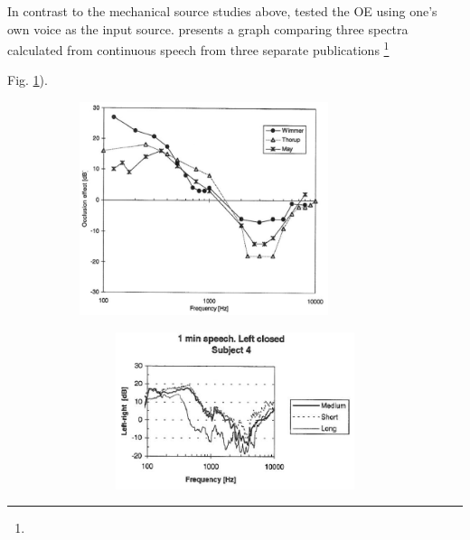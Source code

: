 In contrast to the mechanical source studies above, \cite{hansen:97b} tested the OE using one's own voice as the input source.  \cite{hansen:97b} presents a graph comparing three spectra calculated from continuous speech from three separate publications \DIFdelbegin \footnote{} %
\addtocounter{footnote}{-1}%
\DIFdel{(}\DIFdelend \DIFaddbegin {}\DIFaddend Fig. \ref{fig:hansenAverageOEa}).  
\DIFaddbegin \begin{figure}
\begin{subfigure}{0.45\textwidth}
  \centering
  \includegraphics[width=0.8\textwidth]{figure/hansenAverageOE.png}
  \caption{}
  \label{fig:hansenAverageOEa}
\end{subfigure}%
\hfill
\begin{subfigure}{0.5\textwidth}
  \begin{subfigure}{0.8\textwidth}
    \centering
    \includegraphics[width=1\textwidth]{figure/Hansen_OE-plot_a.png}

\end{subfigure}
\end{subfigure}
\end{figure}
